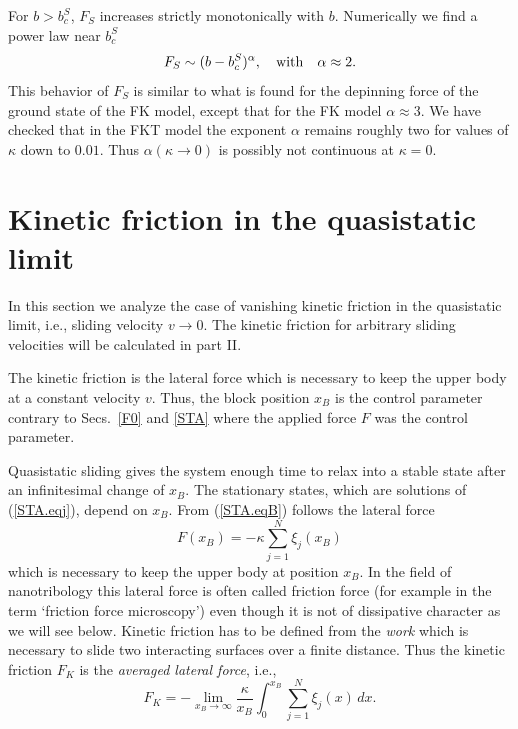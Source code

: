 For $b>b_c^S$, $F_S$ increases strictly monotonically with $b$. 
Numerically we find a power law near $b_c^S$
\begin{equation}
 F_S\sim (b-b_c^S)^\alpha,\quad{\rm with}\quad\alpha\approx 2.
 \label{STA.powlaw}
\end{equation}
This behavior of $F_S$ is similar to what is found for the depinning
force of the ground state of the FK model\cite{pey.83}, except that
for the FK model $\alpha\approx 3$. We have checked that in the FKT
model the exponent $\alpha$ remains roughly two for values of
$\kappa$ down to $0.01$. Thus $\alpha(\kappa\to 0)$ is possibly not
continuous at $\kappa=0$.

\section{\protect\label{KIN}Kinetic friction in the quasistatic limit}

In this section we analyze the case of vanishing kinetic friction in
the quasistatic limit, i.e., sliding velocity $v\to 0$. The kinetic
friction for arbitrary sliding velocities will be calculated in part
II.

The kinetic friction is the lateral force which is necessary to keep
the upper body at a constant velocity $v$. Thus, the block position
$x_B$ is the control parameter contrary to Secs.~\ref{F0} and
\ref{STA} where the applied force $F$ was the control parameter. 

Quasistatic sliding gives the system enough time to relax into a
stable state after an infinitesimal change of $x_B$. The stationary
states, which are solutions of (\ref{STA.eqj}), depend on $x_B$. From
(\ref{STA.eqB}) follows the lateral force 
\begin{equation}
  F(x_B)=-\kappa\sum_{j=1}^N\xi_j(x_B)
  \label{KIN.F}
\end{equation}
which is necessary to keep the upper body at position $x_B$. In the
field of nanotribology\cite{sin.92} this lateral force is often
called friction force (for example in the term `friction force
microscopy') even though it is not of dissipative character as we
will see below.  Kinetic friction has to be defined from the {\em
work\/} which is necessary to slide two interacting surfaces over a
finite distance. Thus the kinetic friction $F_K$ is the {\em averaged
lateral force\/}, i.e.,
\begin{equation}
  F_K=-\lim_{x_B\to\infty}\frac{\kappa}{x_B}\int_0^{x_B}
      \sum_{j=1}^N\xi_j(x)\,dx.
  \label{KIN.FK}
\end{equation}

